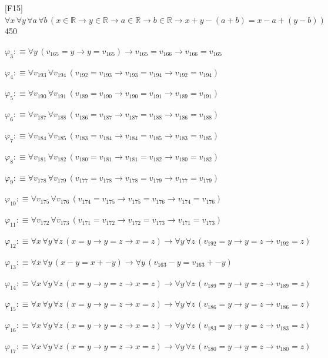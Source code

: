 \begin{fullproof}{[F15]}{$\forall x\,\forall y\,\forall a\,\forall b\,(x \in \mathbb{R} \to y \in \mathbb{R} \to a \in \mathbb{R} \to b \in \mathbb{R} \to x + y - (a + b) = x - a + (y - b))$}{450}
\begin{abbrevlist}
\item $\varphi_{3} :\equiv \forall y\,(v_{165} = y \to y = v_{165}) \to v_{165} = v_{166} \to v_{166} = v_{165}$
\item $\varphi_{4} :\equiv \forall v_{193}\,\forall v_{194}\,(v_{192} = v_{193} \to v_{193} = v_{194} \to v_{192} = v_{194})$
\item $\varphi_{5} :\equiv \forall v_{190}\,\forall v_{191}\,(v_{189} = v_{190} \to v_{190} = v_{191} \to v_{189} = v_{191})$
\item $\varphi_{6} :\equiv \forall v_{187}\,\forall v_{188}\,(v_{186} = v_{187} \to v_{187} = v_{188} \to v_{186} = v_{188})$
\item $\varphi_{7} :\equiv \forall v_{184}\,\forall v_{185}\,(v_{183} = v_{184} \to v_{184} = v_{185} \to v_{183} = v_{185})$
\item $\varphi_{8} :\equiv \forall v_{181}\,\forall v_{182}\,(v_{180} = v_{181} \to v_{181} = v_{182} \to v_{180} = v_{182})$
\item $\varphi_{9} :\equiv \forall v_{178}\,\forall v_{179}\,(v_{177} = v_{178} \to v_{178} = v_{179} \to v_{177} = v_{179})$
\item $\varphi_{10} :\equiv \forall v_{175}\,\forall v_{176}\,(v_{174} = v_{175} \to v_{175} = v_{176} \to v_{174} = v_{176})$
\item $\varphi_{11} :\equiv \forall v_{172}\,\forall v_{173}\,(v_{171} = v_{172} \to v_{172} = v_{173} \to v_{171} = v_{173})$
\item $\varphi_{12} :\equiv \forall x\,\forall y\,\forall z\,(x = y \to y = z \to x = z) \to \forall y\,\forall z\,(v_{192} = y \to y = z \to v_{192} = z)$
\item $\varphi_{13} :\equiv \forall x\,\forall y\,(x - y = x + -y) \to \forall y\,(v_{163} - y = v_{163} + -y)$
\item $\varphi_{14} :\equiv \forall x\,\forall y\,\forall z\,(x = y \to y = z \to x = z) \to \forall y\,\forall z\,(v_{189} = y \to y = z \to v_{189} = z)$
\item $\varphi_{15} :\equiv \forall x\,\forall y\,\forall z\,(x = y \to y = z \to x = z) \to \forall y\,\forall z\,(v_{186} = y \to y = z \to v_{186} = z)$
\item $\varphi_{16} :\equiv \forall x\,\forall y\,\forall z\,(x = y \to y = z \to x = z) \to \forall y\,\forall z\,(v_{183} = y \to y = z \to v_{183} = z)$
\item $\varphi_{17} :\equiv \forall x\,\forall y\,\forall z\,(x = y \to y = z \to x = z) \to \forall y\,\forall z\,(v_{180} = y \to y = z \to v_{180} = z)$

\end{abbrevlist}
\end{fullproof}
